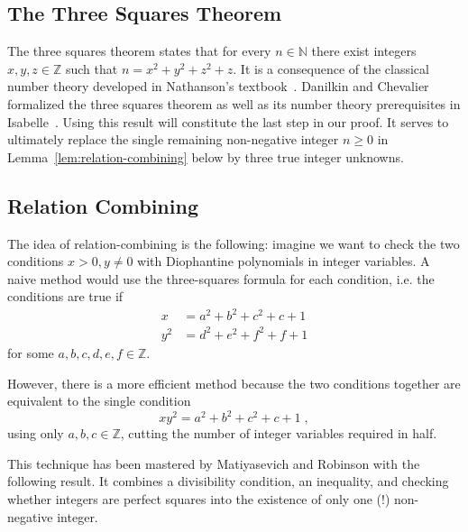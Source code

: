 \documentclass[a4paper,USenglish,cleveref,autoref,thm-restate]{lipics-v2021}
\newcommand{\N}{{\mathbb N}}
\newcommand{\Z}{{\mathbb Z}}
\begin{document}
\subsection{The Three Squares Theorem} \label{sec:three-squares}
The three squares theorem states that for every $n \in \N$ there exist integers $x, y, z \in \Z$ such that $n = x^2 + y^2 + z^2 + z$. It is a consequence of the classical number theory developed in Nathanson's textbook~\cite[Lemma~1.9]{nathanson}. Danilkin and Chevalier formalized the three squares theorem as well as its number theory prerequisites in Isabelle~\cite{three-squares-afp}. Using this result will constitute the last step in our proof. It serves to ultimately replace the single remaining non-negative integer $n \geq 0$ in Lemma~\ref{lem:relation-combining} below by three true integer unknowns.

\subsection{Relation Combining}
The idea of relation-combining is the following: imagine we want to check the two conditions $x > 0, y \ne 0$ with Diophantine polynomials in integer variables. A naive method would use the three-squares formula for each condition, i.e. the conditions are true if
\begin{align*}
x &= a^2+b^2+c^2+c+1 \\
y^2 &= d^2+e^2+f^2+f+1
\end{align*}
for some $a,b,c,d,e,f \in \Z$.

However, there is a more efficient method because the two conditions together are equivalent to the single condition
\[
xy^2 = a^2+b^2+c^2+c+1
\;,
\]
using only $a, b, c \in \Z$, cutting the number of integer variables required in half.

This technique has been mastered by Matiyasevich and Robinson with the following result. It combines a divisibility condition, an inequality, and checking whether integers are perfect squares into the existence of only one (!) non-negative integer.
\end{document}
